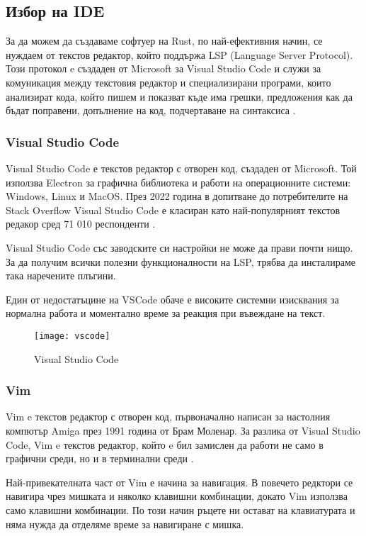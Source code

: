 \subsection{Избор на IDE}
За да можем да създаваме софтуер на Rust, по най-ефективния начин, се нуждаем от
текстов редактор, който поддържа LSP (Language Server Protocol). Този
протокол e създаден от Microsoft за Visual Studio Code и служи за комуникация
между текстовия редактор и специализирани програми, които анализират кода, който
пишем и показват къде има грешки, предложения как да бъдат поправени, допълнение
на код, подчертаване на синтаксиса \cite{lsp_wikipedia}.

\subsubsection{Visual Studio Code}
Visual Studio Code е текстов редактор с отворен код, създаден от Microsoft. Той
използва Electron за графична библиотека и работи на операционните системи: Windows, 
Linux и MacOS. През 2022 година в допитване до потребителите на Stack Overflow Visual
Studio Code е класиран като най-популярният текстов редакор сред 71 010 респонденти
\cite{vscode_wikipedia}.

Visual Studio Code със заводските си настройки не може да прави почти нищо. За
да получим всички полезни функционалности на LSP, трябва да инсталираме така
наречените плъгини.

Един от недостатъцине на VSCode обаче е високите системни изисквания за
нормална работа и моментално време за реакция при въвеждане на текст.
\begin{figure}[!htb]
  \texttt{[image: vscode]}
  \centering
  \caption{Visual Studio Code}
  \label{fig:vscode}
\end{figure}

\subsubsection{Vim}
Vim e текстов редактор с отворен код, първоначално написан за настолния компютър
Amiga през 1991 година от Брам Моленар. За разлика от Visual Studio Code, Vim e
текстов редактор, който e бил замислен да работи не само в графични среди, но и
в терминални среди \cite{vim_wikipedia}. 

Най-привекателната част от Vim е начина за навигация. В повечето редктори се
навигира чрез мишката и няколко клавишни комбинации, докато Vim използва само
клавишни комбинации. По този начин ръцете ни остават на клавиатурата и няма
нужда да отделяме време за навигиране с мишка. 

